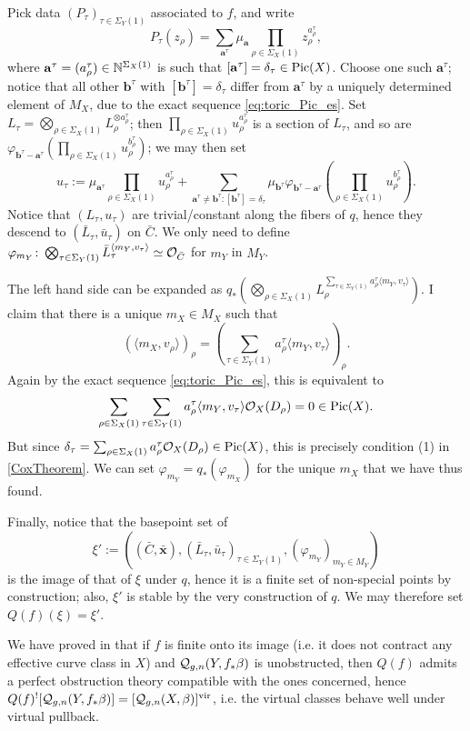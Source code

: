 Pick data $(P_\tau)_{\tau\in\Sigma_Y(1)}$ associated to $f$, and write \[P_\tau(z_\rho)=\sum_{\mathbf a^\tau}\mu_{\mathbf a}\prod_{\rho\in\Sigma_X(1)}z_\rho^{a^\tau_\rho},\] where $\mathbf a^\tau=(a^\tau_\rho)\in\mathbb{N}^{\Sigma_X(1)}$ is such that $[\mathbf a^\tau]=\delta_\tau\in\operatorname{Pic}(X)$. Choose one such $\mathbf a^\tau$; notice that all other $\mathbf b^\tau$ with $[\mathbf b^\tau]=\delta_\tau$ differ from $\mathbf a^\tau$ by a uniquely determined element of $M_X$, due to the exact sequence \eqref{eq:toric_Pic_es}. Set $L_\tau=\bigotimes_{\rho\in\Sigma_X(1)}L_\rho^{\otimes a^\tau_\rho}$; then $\prod_{\rho\in\Sigma_X(1)}u_\rho^{a^\tau_\rho}$ is a section of $L_\tau$, and so are $\varphi_{\mathbf b^\tau-\mathbf a^\tau}(\prod_{\rho\in\Sigma_X(1)}u_\rho^{b^\tau_\rho})$; we may then set 
\[u_\tau:=\mu_{\mathbf a^\tau}\prod_{\rho\in\Sigma_X(1)}u_\rho^{a^\tau_\rho}+\sum_{\mathbf a^\tau\neq \mathbf b^\tau:[\mathbf b^\tau]=\delta_\tau}\mu_{\mathbf b^\tau}\varphi_{\mathbf b^\tau-\mathbf a^\tau}\left(\prod_{\rho\in\Sigma_X(1)}u_\rho^{b^\tau_\rho}\right).\]
Notice that $(L_\tau,u_\tau)$ are trivial/constant along the fibers of $q$, hence they descend to $(\bar L_\tau,\bar u_\tau)$ on $\bar C$. We only need to define $\varphi_{m_Y}\colon \bigotimes_{\tau\in\Sigma_Y(1)}\bar L_\tau^{\langle m_Y,v_\tau\rangle}\simeq \mathcal{O}_{\bar C}$ for $m_Y$ in $M_Y$.

The left hand side can be expanded as $q_*\left(\bigotimes_{\rho\in\Sigma_X(1)}L_\rho^{\sum_{\tau\in\Sigma_Y(1)}a^\tau_\rho \langle m_Y,v_\tau\rangle} \right)$. I claim that there is a unique $m_X\in M_X$ such that \[(\langle m_X,v_\rho\rangle)_\rho= (\sum_{\tau\in\Sigma_Y(1)}a^\tau_\rho \langle m_Y,v_\tau\rangle)_\rho.\] Again by the exact sequence \eqref{eq:toric_Pic_es}, this is equivalent to \[\sum_{\rho\in\Sigma_X(1)}\sum_{\tau\in\Sigma_Y(1)}a^\tau_\rho \langle m_Y,v_\tau\rangle\mathcal{O}_X(D_\rho)=0\in\operatorname{Pic}(X).\] But since $\delta_\tau=\sum_{\rho\in\Sigma_X(1)}a^\tau_\rho\mathcal{O}_X(D_\rho)\in \operatorname{Pic}(X)$, this is precisely condition (1) in \ref{CoxTheorem}. We can set $\varphi_{m_Y}=q_*(\varphi_{m_X})$ for the unique $m_X$ that we have thus found.

Finally, notice that the basepoint set of \[\xi':=\left((\bar C,\bar{\mathbf x}),(\bar L_\tau,\bar u_\tau)_{\tau\in\Sigma_Y(1)},(\varphi_{m_Y})_{m_Y\in M_Y}\right)\] is the image of that of $\xi$ under $q$, hence it is a finite set of non-special points by construction; also, $\xi'$ is stable by the very construction of $q$. We may therefore set $Q(f)(\xi)=\xi'$.

\begin{rmk} We have proved in \cite[Lemma B.5]{BN} that if $f$ is finite onto its image (i.e. it does not contract any effective curve class in $X$) and $\mathcal{Q}_{g,n}(Y,f_*\beta)$ is unobstructed, then $Q(f)$ admits a perfect obstruction theory compatible with the ones concerned, hence $Q(f)^![\mathcal{Q}_{g,n}(Y,f_*\beta)]=[\mathcal{Q}_{g,n}(X,\beta)]^{\mathrm{vir}}$, i.e. the virtual classes behave well under virtual pullback. \end{rmk}

